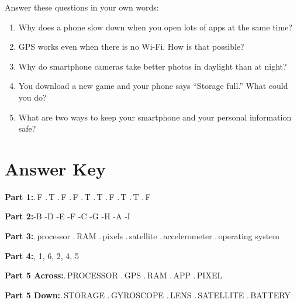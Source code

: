 \begin{tcolorbox}[enhanced,colback=SunYellow!10,colframe=SunYellow!70!black,arc=6pt,boxrule=1pt,
  left=10pt,right=10pt,top=8pt,bottom=8pt]

Answer these questions in your own words:

\begin{enumerate}[label=\textbf{\arabic*.}]
  \item Why does a phone slow down when you open lots of apps at the same time?
  \item GPS works even when there is no Wi-Fi. How is that possible?
  \item Why do smartphone cameras take better photos in daylight than at night?
  \item You download a new game and your phone says ``Storage full.''  What could you do?
  \item What are two ways to keep your smartphone and your personal information safe?
\end{enumerate}
\end{tcolorbox}

\vspace{16pt}

\section*{Answer Key}

\begin{tcolorbox}[enhanced,colback=LightGray,colframe=TechPurple!50,arc=6pt,boxrule=1pt,
  left=10pt,right=10pt,top=8pt,bottom=8pt,
  title={Answers (no peeking until you try!)},fonttitle=\bfseries\color{DarkText}]

\textbf{Part 1:}.\,F .\,T .\,F .\,F .\,T .\,T .\,F .\,T .\,T .\,F

\vspace{6pt}
\textbf{Part 2:}-B -D -E -F -C -G -H -A -I

\vspace{6pt}
\textbf{Part 3:}.\,processor .\,RAM .\,pixels .\,satellite .\,accelerometer .\,operating system

\vspace{6pt}
\textbf{Part 4:}, 1, 6, 2, 4, 5

\vspace{6pt}
\textbf{Part 5 Across:}.\,PROCESSOR .\,GPS .\,RAM .\,APP .\,PIXEL

\textbf{Part 5 Down:}.\,STORAGE .\,GYROSCOPE .\,LENS .\,SATELLITE .\,BATTERY

\end{tcolorbox}
